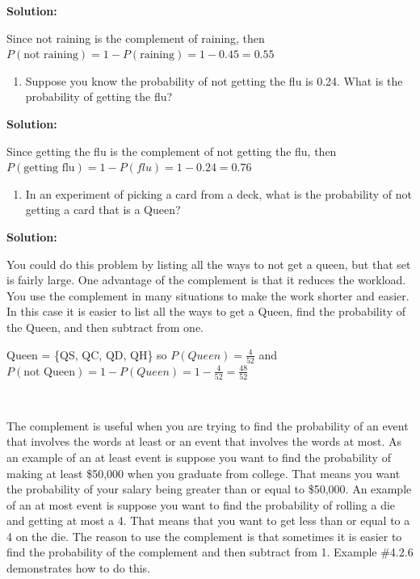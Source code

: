 \documentclass[
]{book}
\providecommand{\tightlist}{%
  \setlength{\itemsep}{0pt}\setlength{\parskip}{0pt}}
\begin{document}
\textbf{Solution:}

Since not raining is the complement of raining, then \(P(\text{not raining})=1-P(\text{raining}) = 1-0.45=0.55\)

\begin{enumerate}
\def\labelenumi{\alph{enumi}.}
\setcounter{enumi}{1}
\tightlist
\item
  Suppose you know the probability of not getting the flu is 0.24. What is the probability of getting the flu?
\end{enumerate}

\textbf{Solution:}

Since getting the flu is the complement of not getting the flu, then \(P(\text{getting flu})=1-P(flu)=1-0.24=0.76\)

\begin{enumerate}
\def\labelenumi{\alph{enumi}.}
\setcounter{enumi}{2}
\tightlist
\item
  In an experiment of picking a card from a deck, what is the probability of not getting a card that is a Queen?
\end{enumerate}

\textbf{Solution:}

You could do this problem by listing all the ways to not get a queen, but that set is fairly large. One advantage of the complement is that it reduces the workload. You use the complement in many situations to make the work shorter and easier. In this case it is easier to list all the ways to get a Queen, find the probability of the Queen, and then subtract from one.

Queen = \{QS, QC, QD, QH\} so \(P(Queen)=\frac{4}{52}\) and \(P(\text{not Queen})=1-P(Queen)=1-\frac{4}{52}=\frac{48}{52}\)

\textbf{\\
}

The complement is useful when you are trying to find the probability of an event that involves the words at least or an event that involves the words at most. As an example of an at least event is suppose you want to find the probability of making at least \$50,000 when you graduate from college. That means you want the probability of your salary being greater than or equal to \$50,000. An example of an at most event is suppose you want to find the probability of rolling a die and getting at most a 4. That means that you want to get less than or equal to a 4 on the die. The reason to use the complement is that sometimes it is easier to find the probability of the complement and then subtract from 1. Example \#4.2.6 demonstrates how to do this.
\end{document}
